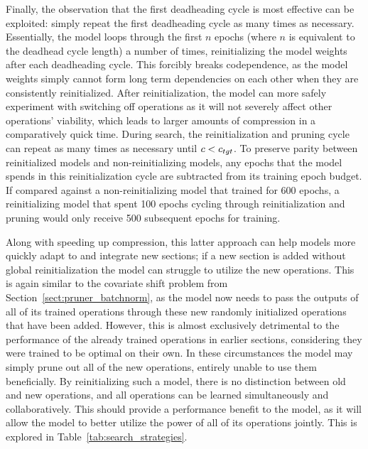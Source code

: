 Finally, the observation that the first deadheading cycle is most effective can be exploited: simply
repeat the first deadheading cycle as many times as necessary. Essentially, the model loops through the first
$n$ epochs (where $n$ is equivalent to the deadhead cycle length) a number of times, reinitializing the model
weights after each deadheading cycle. This forcibly breaks codependence, as the model weights simply cannot form long term
dependencies on each other when they are consistently reinitialized. After reinitialization, the model can more safely
experiment with switching off operations as it will not severely affect other operations' viability, which leads to larger
amounts of compression in a comparatively quick time. During search, the reinitialization and pruning cycle can repeat as many times
as necessary until $c<c_{tgt}$. To preserve parity between reinitialized models and non-reinitializing models, any epochs
that the model spends in this reinitialization cycle are subtracted from its training epoch budget. If compared against a
non-reinitializing model that trained for 600 epochs, a reinitializing model that spent 100 epochs cycling through
reinitialization and pruning would only receive 500 subsequent epochs for training.

Along with speeding up compression, this latter approach can help models more quickly adapt to and integrate new sections; if a new section
is added without global reinitialization
the model can struggle to utilize the new operations. This is again similar to the covariate shift problem from
Section~\ref{sect:pruner_batchnorm}, as the model now needs to pass the outputs of all of its trained operations through
these new randomly initialized operations that have been added. However, this is almost exclusively detrimental to the
performance of the already trained operations in earlier sections, considering they were trained to be optimal on their own.
In these circumstances the model may simply prune out all of the new operations, entirely unable to use them beneficially.
By reinitializing such a model, there is no distinction between old and new operations, and all operations can be
learned simultaneously and collaboratively. This should provide a performance benefit to the model, as it will allow the model to better utilize
the power of all of its operations jointly. This is explored in Table~\ref{tab:search_strategies}.

